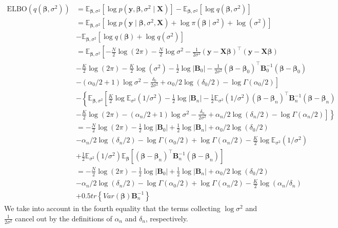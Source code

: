\begin{enumerate}[leftmargin=*]
\begin{align*}
	\text{ELBO}(q(\boldsymbol{\beta},\sigma^2))&=\mathbb{E}_{\boldsymbol{\beta},\sigma^2}[\log p(\boldsymbol{y},\boldsymbol{\beta},\sigma^2\mid\boldsymbol{X})]-\mathbb{E}_{\boldsymbol{\beta},\sigma^2}[\log q(\boldsymbol{\beta},\sigma^2)]\\
	&=\mathbb{E}_{\boldsymbol{\beta},\sigma^2}[\log p(\boldsymbol{y}\mid\boldsymbol{\beta},\sigma^2,\boldsymbol{X})+\log \pi(\boldsymbol{\beta}\mid\sigma^2)+\log(\sigma^2)]\\
	&-\mathbb{E}_{\boldsymbol{\beta},\sigma^2}[\log q(\boldsymbol{\beta}) + \log q(\sigma^2)]\\
	&=\mathbb{E}_{\boldsymbol{\beta},\sigma^2}\left[-\frac{N}{2}\log (2\pi)-\frac{N}{2}\log\sigma^2 - \frac{1}{2\sigma^2}(\boldsymbol{y}-\boldsymbol{X}\boldsymbol{\beta})^{\top}(\boldsymbol{y}-\boldsymbol{X}\boldsymbol{\beta})\right.\\
	&\left.-\frac{K}{2}\log(2\pi)-\frac{K}{2}\log(\sigma^2)-\frac{1}{2}\log|\boldsymbol{B}_0|-\frac{1}{2\sigma^2}(\boldsymbol{\beta}-\boldsymbol{\beta}_0)^{\top}\boldsymbol{B}_0^{-1}(\boldsymbol{\beta}-\boldsymbol{\beta}_0)\right.\\
	&-\left.(\alpha_0/2+1)\log\sigma^2-\frac{\delta_0}{2\sigma^2}+\alpha_0/2\log(\delta_0/2)-\log\Gamma(\alpha_0/2)\right]\\
	&-\left\{\mathbb{E}_{\boldsymbol{\beta},\sigma^2}\left[\frac{K}{2}\log\mathbb{E}_{{\sigma^2}}(1/\sigma^2)-\frac{1}{2}\log|\boldsymbol{B}_n|-\frac{1}{2}\mathbb{E}_{{\sigma^2}}(1/\sigma^2)(\boldsymbol{\beta}-\boldsymbol{\beta}_n)^{\top}\boldsymbol{B}_n^{-1}(\boldsymbol{\beta}-\boldsymbol{\beta}_n)\right.\right.\\
	&\left.\left.-\frac{K}{2}\log(2\pi)-(\alpha_n/2+1)\log\sigma^2-\frac{\delta_n}{2\sigma^2}+\alpha_n/2\log(\delta_n/2)-\log\Gamma(\alpha_n/2)\right]\right\}\\
	&=-\frac{N}{2}\log (2\pi)-\frac{1}{2}\log|\boldsymbol{B}_0|+\frac{1}{2}\log|\boldsymbol{B}_n|+\alpha_0/2\log(\delta_0/2)\\
	&-\alpha_n/2\log(\delta_n/2)-\log\Gamma(\alpha_0/2)+\log\Gamma(\alpha_n/2)-\frac{K}{2}\log\mathbb{E}_{{\sigma^2}}(1/\sigma^2)\\
	&+\frac{1}{2}\mathbb{E}_{{\sigma^2}}(1/\sigma^2)\mathbb{E}_{\boldsymbol{\beta}}\left[(\boldsymbol{\beta}-\boldsymbol{\beta}_n)^{\top}\boldsymbol{B}_n^{-1}(\boldsymbol{\beta}-\boldsymbol{\beta}_n)\right]\\
	&=-\frac{N}{2}\log (2\pi)-\frac{1}{2}\log|\boldsymbol{B}_0|+\frac{1}{2}\log|\boldsymbol{B}_n|+\alpha_0/2\log(\delta_0/2)\\
	&-\alpha_n/2\log(\delta_n/2)-\log\Gamma(\alpha_0/2)+\log\Gamma(\alpha_n/2)-\frac{K}{2}\log(\alpha_n/\delta_n)\\
	&+0.5tr\left\{Var(\boldsymbol{\beta})\boldsymbol{B}_n^{-1}\right\}
\end{align*}
We take into account in the fourth equality that the terms collecting $\log\sigma^2$ and $\frac{1}{2\sigma^2}$ cancel out by the definitions of $\alpha_n$ and $\delta_n$, respectively.


\end{enumerate}
